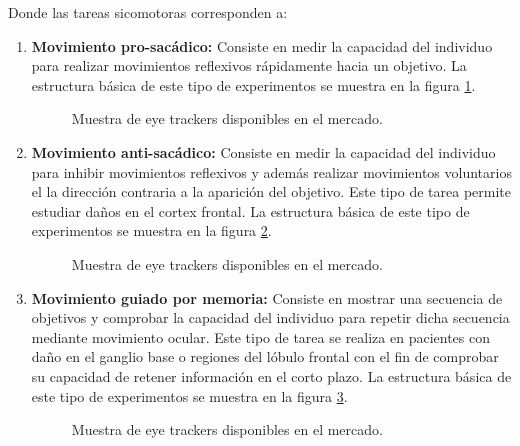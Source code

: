 \documentclass[../main.tex]{subfiles}
\begin{document}
		Donde las tareas sicomotoras corresponden a:
		\begin{enumerate}
			\item \textbf{Movimiento pro-sacádico:} Consiste en medir la capacidad del individuo para realizar movimientos reflexivos rápidamente hacia un objetivo. La estructura básica de este tipo de experimentos se muestra en la figura \ref{fig:02_prosaccade_base}.
				\begin{figure}[H]
					\centering
					\hspace{5mm}
					\caption{Muestra de eye trackers disponibles en el mercado.}
					\label{fig:02_prosaccade_base}
				\end{figure}  

			\item \textbf{Movimiento anti-sacádico:} Consiste en medir la capacidad del individuo para inhibir movimientos reflexivos y además realizar movimientos voluntarios el la dirección contraria a la aparición del objetivo. Este tipo de tarea permite estudiar daños en el cortex frontal. La estructura básica de este tipo de experimentos se muestra en la figura \ref{fig:02_antisaccade_base}.
				\begin{figure}[H]
					\centering
					\hspace{5mm}
					\caption{Muestra de eye trackers disponibles en el mercado.}
					\label{fig:02_antisaccade_base}
				\end{figure}    

		 	\item \textbf{Movimiento guiado por memoria:} Consiste en mostrar una secuencia de objetivos y comprobar la capacidad del individuo para repetir dicha secuencia mediante movimiento ocular. Este tipo de tarea se realiza en pacientes con daño en el ganglio base o regiones del lóbulo frontal con el fin de comprobar su capacidad de retener información en el corto plazo. La estructura básica de este tipo de experimentos se muestra en la figura \ref{fig:02_memmory_base}.
		 		\begin{figure}[H]
					\centering
					\hspace{5mm}
					\caption{Muestra de eye trackers disponibles en el mercado.}
					\label{fig:02_memmory_base}
				\end{figure}  

		 \end{enumerate} 
\end{document}
